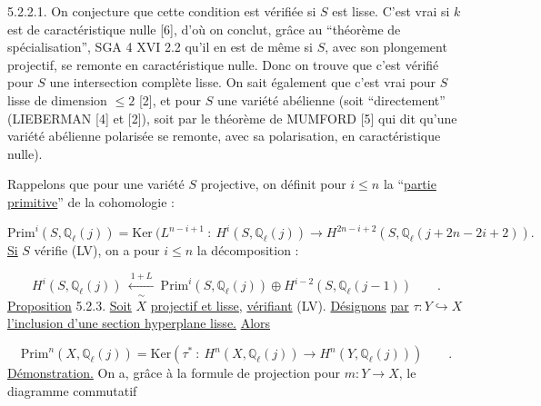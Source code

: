 
5.2.2.1.  On conjecture que cette condition est vérifiée si $S$ est lisse. C'est vrai si $k$ est de caractéristique nulle [6], d'où on conclut, grâce au ``théorème de spécialisation'', SGA 4 XVI 2.2 qu'il en est de même si $S$, avec son plongement projectif, se remonte en caractéristique nulle. Donc on trouve que c'est vérifié pour $S$ une intersection complète lisse. On sait également que c'est vrai pour $S$ lisse de dimension $\leq 2$ [2], et pour $S$ une variété abélienne (soit ``directement'' (LIEBERMAN [4] et [2]), soit par le théorème de MUMFORD [5] qui dit qu'une variété abélienne polarisée se remonte, avec sa polarisation, en caractéristique nulle).

Rappelons que pour une variété $S$ projective, on définit pour $i \leq n$ la ``\underline{partie primitive}'' de la cohomologie :

\begin{equation}\tag{5.2.2.2}
\mathrm{Prim}^i(S,\mathbb{Q}_\ell(j)) = \mathrm{Ker}\ (L^{n-i+1} \ :\ H^i(S,\mathbb{Q}_\ell(j)) \longrightarrow H^{2n-i+2}(S,\mathbb{Q}_\ell(j+2n-2i+2)).
\end{equation}
\underline{Si} $S$ vérifie (LV), on a pour $i \leq n$ la décomposition :

\begin{equation}\tag{5.2.2.3}
H^i(S,\mathbb{Q}_\ell(j)) \ \xleftarrow[\sim]{\ 1+L\ }\ \mathrm{Prim}^i(S,\mathbb{Q}_\ell(j)) \oplus H^{i-2}(S,\mathbb{Q}_\ell(j-1)) \qquad .
\end{equation}
\underline{Proposition} 5.2.3.  \underline{Soit} $X$ \underline{projectif et lisse,} \underline{vérifiant} (LV). \underline{Désignons} \underline{par} $\tau : Y \hookrightarrow X$ \underline{l'inclusion d'une section hyperplane lisse.} \underline{Alors}

\begin{equation}\tag{5.2.3.1}
\mathrm{Prim}^n(X,\mathbb{Q}_\ell(j)) = \mathrm{Ker}(\tau^* \ :\ H^n(X,\mathbb{Q}_\ell(j)) \longrightarrow H^n(Y,\mathbb{Q}_\ell(j))) \qquad .
\end{equation}
\underline{Démonstration.}  On a, grâce à la formule de projection pour $m : Y \longrightarrow X$, le diagramme commutatif 



